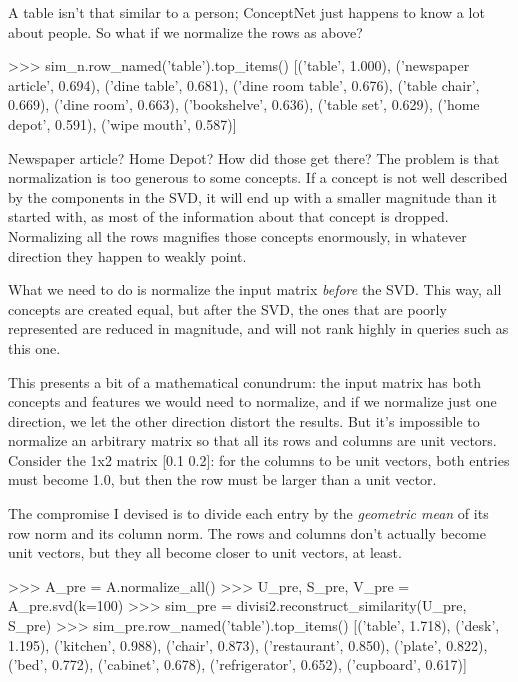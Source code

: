 \documentclass[11pt]{article}
\begin{document}
A table isn't that similar to a person; ConceptNet just happens to know a lot about
people. So what if we normalize the rows as above?

\begin{python}
>>> sim_n.row_named('table').top_items()
[('table', 1.000), ('newspaper article', 0.694), ('dine table', 0.681),
('dine room table', 0.676), ('table chair', 0.669), ('dine room', 0.663),
('bookshelve', 0.636), ('table set', 0.629), ('home depot', 0.591),
('wipe mouth', 0.587)]
\end{python}

Newspaper article? Home Depot? How did those get there? The problem is that
normalization is too generous to some concepts. If a concept is not well
described by the components in the SVD, it will end up with a smaller magnitude than it started
with, as most of the information about that concept is dropped.  Normalizing
all the rows magnifies those concepts enormously, in whatever direction they
happen to weakly point.

What we need to do is normalize the input matrix {\em before} the SVD. This
way, all concepts are created equal, but after the SVD, the ones that are
poorly represented are reduced in magnitude, and will not rank highly in queries
such as this one.

This presents a bit of a mathematical conundrum: the input matrix has both
concepts and features we would need to normalize, and if we normalize just one
direction, we let the other direction distort the results. But it's impossible
to normalize an arbitrary matrix so that all its rows and columns are unit
vectors. Consider the 1x2 matrix [0.1 0.2]: for the columns to be unit vectors,
both entries must become 1.0, but then the row must be larger than a unit
vector.

The compromise I devised is to divide each entry by the {\em geometric mean} of its
row norm and its column norm. The rows and columns don't actually become unit
vectors, but they all become closer to unit vectors, at least.

\begin{python}
>>> A_pre = A.normalize_all()
>>> U_pre, S_pre, V_pre = A_pre.svd(k=100)
>>> sim_pre = divisi2.reconstruct_similarity(U_pre, S_pre)
>>> sim_pre.row_named('table').top_items()
[('table', 1.718), ('desk', 1.195), ('kitchen', 0.988), ('chair', 0.873),
('restaurant', 0.850), ('plate', 0.822), ('bed', 0.772), ('cabinet', 0.678), 
('refrigerator', 0.652), ('cupboard', 0.617)]
\end{python}
\end{document}
